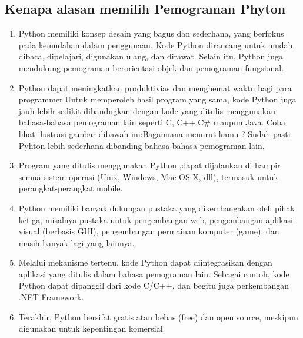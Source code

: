 \subsection{Kenapa alasan memilih Pemograman Phyton}
\begin{enumerate}
\item Python memiliki konsep desain yang bagus dan sederhana, yang berfokus pada kemudahan dalam penggunaan. Kode Python dirancang untuk mudah dibaca, dipelajari, digunakan ulang, dan dirawat. Selain itu, Python juga mendukung pemograman berorientasi objek dan pemograman fungsional.
\item Python dapat meningkatkan produktivias dan menghemat waktu bagi para programmer.Untuk memperoleh hasil program yang sama, kode Python juga jauh lebih sedikit dibandngkan dengan kode yang ditulis menggunakan bahasa-bahasa pemograman lain seperti C, C++,C# maupun Java. Coba lihat ilustrasi gambar dibawah ini:Bagaimana menurut kamu ? Sudah pasti Pyhton lebih sederhana dibanding bahasa-bahasa pemograman lain.
\item Program yang ditulis menggunakan Python ,dapat dijalankan di hampir semua sistem operasi (Unix, Windows, Mac OS X, dll), termasuk untuk perangkat-perangkat mobile.
\item Python memiliki banyak dukungan pustaka yang dikembangakan oleh pihak ketiga, misalnya pustaka untuk pengembangan web, pengembangan aplikasi visual (berbasis GUI), pengembangan permainan komputer (game), dan masih banyak lagi yang lainnya.
\item Melalui mekanisme tertenu, kode Python dapat diintegrasikan dengan aplikasi yang ditulis dalam bahasa pemograman lain. Sebagai contoh, kode Python dapat dipanggil dari kode C/C++, dan begitu juga perkembangan .NET Framework.
\item Terakhir, Python bersifat gratis atau bebas (free) dan open source, meskipun digunakan untuk kepentingan komersial.
\end{enumerate}

